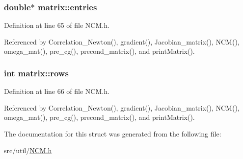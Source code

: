 \subsubsection[{entries}]{\setlength{\rightskip}{0pt plus 5cm}double$\ast$ matrix\+::entries}\label{structmatrix_a720057f595a0b775b6d7d8c9badaca78}


Definition at line 65 of file N\+C\+M.\+h.



Referenced by Correlation\+\_\+\+Newton(), gradient(), Jacobian\+\_\+matrix(), N\+C\+M(), omega\+\_\+mat(), pre\+\_\+cg(), precond\+\_\+matrix(), and print\+Matrix().

\hypertarget{structmatrix_af83737a5597214de0458c5535a787143}{}
\subsubsection[{rows}]{\setlength{\rightskip}{0pt plus 5cm}int matrix\+::rows}\label{structmatrix_af83737a5597214de0458c5535a787143}


Definition at line 66 of file N\+C\+M.\+h.



Referenced by Correlation\+\_\+\+Newton(), gradient(), Jacobian\+\_\+matrix(), N\+C\+M(), omega\+\_\+mat(), pre\+\_\+cg(), precond\+\_\+matrix(), and print\+Matrix().



The documentation for this struct was generated from the following file\+:\begin{DoxyCompactItemize}
\item 
src/util/\hyperlink{NCM_8h}{N\+C\+M.\+h}\end{DoxyCompactItemize}
